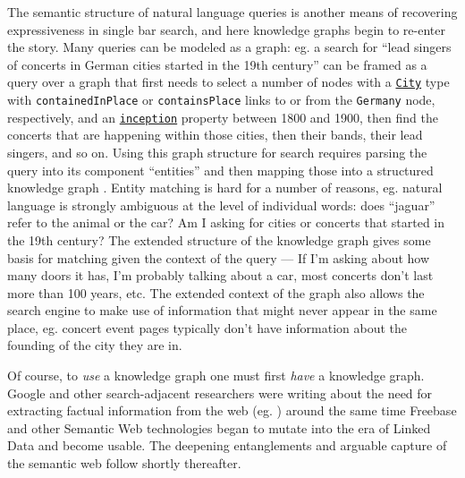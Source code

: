 \documentclass{article}
\begin{document}
The semantic structure of natural language queries is another means of
recovering expressiveness in single bar search, and here knowledge
graphs begin to re-enter the story. Many queries can be modeled as a
graph: eg. a search for ``lead singers of concerts in German cities
started in the 19th century'' can be framed as a query over a graph that
first needs to select a number of nodes with a
\href{https://schema.org/City}{\texttt{City}} type with
\texttt{containedInPlace} or \texttt{containsPlace} links to or from the
\texttt{Germany} node, respectively, and an
\href{https://www.wikidata.org/wiki/Property:P571}{\texttt{inception}}
property between 1800 and 1900, then find the concerts that are
happening within those cities, then their bands, their lead singers, and
so on. Using this graph structure for search requires parsing the query
into its component ``entities'' and then mapping those into a structured
knowledge graph \cite{liUnderstandingSemanticStructure2010, reisingerFineGrainedClassLabel2011, pascaWhatYouSeek2007} . Entity
matching is hard for a number of reasons, eg. natural language is
strongly ambiguous at the level of individual words: does ``jaguar''
refer to the animal or the car? Am I asking for cities or concerts that
started in the 19th century? The extended structure of the knowledge
graph gives some basis for matching given the context of the query ---
If I'm asking about how many doors it has, I'm probably talking about a
car, most concerts don't last more than 100 years, etc. The extended
context of the graph also allows the search engine to make use of
information that might never appear in the same place, eg. concert event
pages typically don't have information about the founding of the city
they are in.

Of course, to \emph{use} a knowledge graph one must first \emph{have} a
knowledge graph. Google and other search-adjacent researchers were
writing about the need for extracting factual information from the web
(eg. \cite{halevyUnreasonableEffectivenessData2009, pascaTurningWebText2008, pascaWeaklysupervisedDiscoveryNamed2007, pascaOrganizingSearchingWorld2007, pascaOrganizingSearchingWorld2006, pascaAcquisitionCategorizedNamed2004} ) around the same time Freebase
and other Semantic Web technologies began to mutate into the era of
Linked Data and become usable. The deepening entanglements and arguable
capture of the semantic web follow shortly thereafter.
\end{document}
